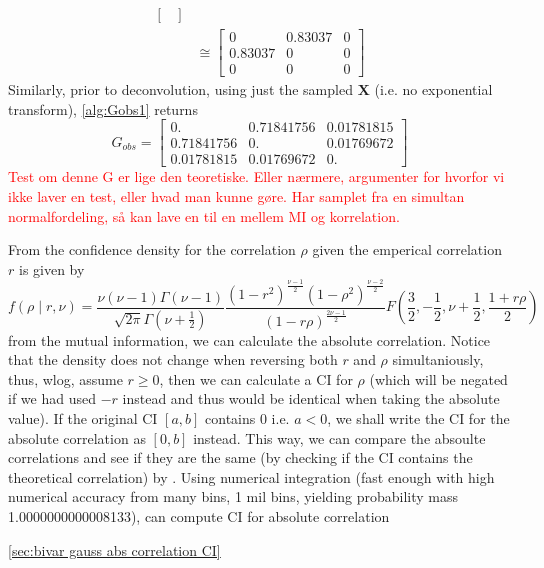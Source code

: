 \documentclass[../Thesis.tex]{subfiles}
\begin{document}
\begin{example}
\begin{align*}
\begin{bmatrix}
        \end{bmatrix} \\
                & \cong
        \begin{bmatrix}
            0       & 0.83037 & 0 \\
            0.83037 & 0       & 0 \\
            0       & 0       & 0
        \end{bmatrix}
    \end{align*}
    Similarly, prior to deconvolution, using just the sampled $\boldsymbol X$ (i.e. no exponential transform), \autoref{alg:Gobs1} returns
    $$G_{obs} =
        \begin{bmatrix}
            0.         & 0.71841756 & 0.01781815 \\
            0.71841756 & 0.         & 0.01769672 \\
            0.01781815 & 0.01769672 & 0.
        \end{bmatrix}
    $$
    \textcolor{red}{Test om denne G er lige den teoretiske. Eller nærmere, argumenter for hvorfor vi ikke laver en test, eller hvad man kunne gøre. Har samplet fra en simultan normalfordeling, så kan lave en til en mellem MI og korrelation. }
    
    From the confidence density for the correlation $\rho$ given the emperical correlation $r$ is given by
    $$f\left(\rho \mid r,\nu\right) = \frac{\nu (\nu-1) \Gamma(\nu-1)}{\sqrt{2\pi} \Gamma(\nu + \frac{1}{2})} \frac{\left(1-r^2\right)^{\frac{\nu-1}{2}} \left(1-\rho^2\right)^{\frac{\nu-2}{2}} }{\left(1-r\rho\right)^{\frac{2\nu-1}{2}}} F\left(\frac{3}{2}, -\frac{1}{2}, \nu+\frac{1}{2}, \frac{1+r\rho}{2}\right)$$
    from the mutual information, we can calculate the absolute correlation. Notice that the density does not change when reversing both $r$ and $\rho$ simultaniously, thus, wlog, assume $r\geq 0$, then we can calculate a CI for $\rho$ (which will be negated if we had used $-r$ instead and thus would be identical when taking the absolute value). If the original CI $[a,b]$ contains $0$ i.e. $a<0$, we shall write the CI for the absolute correlation as $[0,b]$ instead. This way, we can compare the absoulte correlations and see if they are the same (by checking if the CI contains the theoretical correlation) by \cite{Confidence-in-Correlation}. Using numerical integration (fast enough with high numerical accuracy from many bins, 1 mil bins, yielding probability mass 1.0000000000008133), can compute CI for absolute correlation

    \autoref{sec:bivar gauss abs correlation CI}



\end{example}
\end{document}
